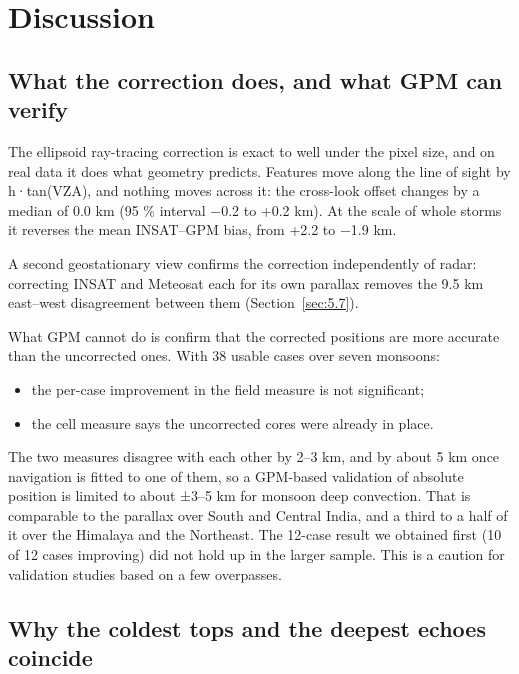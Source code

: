 \section{Discussion}
\label{sec:discussion}
\label{sec:6}

\subsection{What the correction does, and what GPM can verify}\label{sec:6.1}

The ellipsoid ray-tracing correction is exact to well under the pixel size, and on real data it does what geometry predicts. Features move along the line of sight by h·tan(VZA), and nothing moves across it: the cross-look offset changes by a median of 0.0 km (95 \% interval −0.2 to +0.2 km). At the scale of whole storms it reverses the mean INSAT--GPM bias, from +2.2 to −1.9 km.

A second geostationary view confirms the correction independently of radar: correcting INSAT and Meteosat each for its own parallax removes the 9.5 km east--west disagreement between them (Section~\ref{sec:5.7}).

What GPM cannot do is confirm that the corrected positions are more accurate than the uncorrected ones. With 38 usable cases over seven monsoons:

\begin{itemize}
\tightlist
\item
  the per-case improvement in the field measure is not significant;
\item
  the cell measure says the uncorrected cores were already in place.
\end{itemize}

The two measures disagree with each other by 2--3 km, and by about 5 km once navigation is fitted to one of them, so a GPM-based validation of absolute position is limited to about ±3--5 km for monsoon deep convection. That is comparable to the parallax over South and Central India, and a third to a half of it over the Himalaya and the Northeast. The 12-case result we obtained first (10 of 12 cases improving) did not hold up in the larger sample. This is a caution for validation studies based on a few overpasses.

\subsection{Why the coldest tops and the deepest echoes coincide}\label{sec:6.2}

